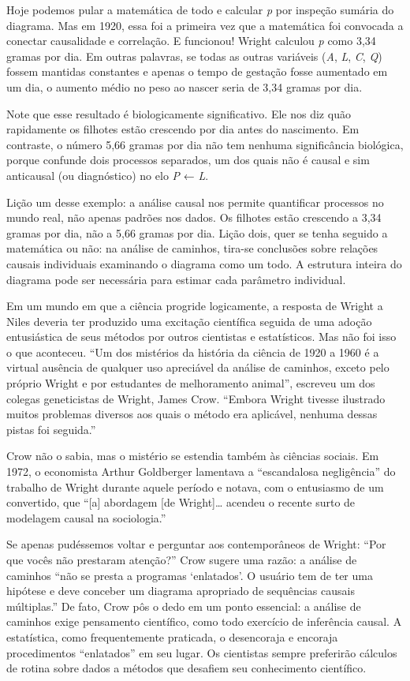 \documentclass[11pt,a5paper,twoside]{book}
\begin{document}
Hoje podemos pular a matemática de todo e calcular \textit{p} por inspeção sumária do diagrama. Mas em 1920, essa foi a primeira vez que a matemática foi convocada a conectar causalidade e correlação. E funcionou! Wright calculou \textit{p} como 3,34 gramas por dia. Em outras palavras, se todas as outras variáveis (\textit{A}, \textit{L}, \textit{C}, \textit{Q}) fossem mantidas constantes e apenas o tempo de gestação fosse aumentado em um dia, o aumento médio no peso ao nascer seria de 3,34 gramas por dia.

Note que esse resultado é biologicamente significativo. Ele nos diz quão rapidamente os filhotes estão crescendo por dia antes do nascimento. Em contraste, o número 5,66 gramas por dia não tem nenhuma significância biológica, porque confunde dois processos separados, um dos quais não é causal e sim anticausal (ou diagnóstico) no elo \textit{P} ← \textit{L}.

Lição um desse exemplo: a análise causal nos permite quantificar processos no mundo real, não apenas padrões nos dados. Os filhotes estão crescendo a 3,34 gramas por dia, não a 5,66 gramas por dia. Lição dois, quer se tenha seguido a matemática ou não: na análise de caminhos, tira-se conclusões sobre relações causais individuais examinando o diagrama como um todo. A estrutura inteira do diagrama pode ser necessária para estimar cada parâmetro individual.

Em um mundo em que a ciência progride logicamente, a resposta de Wright a Niles deveria ter produzido uma excitação científica seguida de uma adoção entusiástica de seus métodos por outros cientistas e estatísticos. Mas não foi isso o que aconteceu. “Um dos mistérios da história da ciência de 1920 a 1960 é a virtual ausência de qualquer uso apreciável da análise de caminhos, exceto pelo próprio Wright e por estudantes de melhoramento animal”, escreveu um dos colegas geneticistas de Wright, James Crow. “Embora Wright tivesse ilustrado muitos problemas diversos aos quais o método era aplicável, nenhuma dessas pistas foi seguida.”

Crow não o sabia, mas o mistério se estendia também às ciências sociais. Em 1972, o economista Arthur Goldberger lamentava a “escandalosa negligência” do trabalho de Wright durante aquele período e notava, com o entusiasmo de um convertido, que “[a] abordagem [de Wright]… acendeu o recente surto de modelagem causal na sociologia.”

Se apenas pudéssemos voltar e perguntar aos contemporâneos de Wright: “Por que vocês não prestaram atenção?” Crow sugere uma razão: a análise de caminhos “não se presta a programas ‘enlatados’. O usuário tem de ter uma hipótese e deve conceber um diagrama apropriado de sequências causais múltiplas.” De fato, Crow pôs o dedo em um ponto essencial: a análise de caminhos exige pensamento científico, como todo exercício de inferência causal. A estatística, como frequentemente praticada, o desencoraja e encoraja procedimentos “enlatados” em seu lugar. Os cientistas sempre preferirão cálculos de rotina sobre dados a métodos que desafiem seu conhecimento científico.
\end{document}
